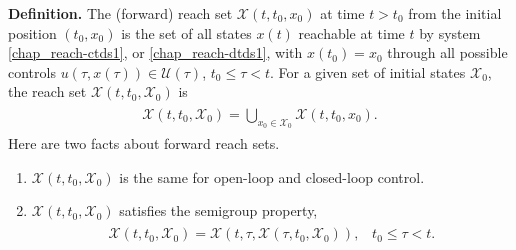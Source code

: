 \documentclass[letterpaper,10pt,english]{sphinxmanual}
\begin{document}
\textbf{Definition.} The (forward) reach set ${\mathcal X}(t, t_0, x_0)$ at time
$t>t_0$ from the initial position $(t_0, x_0)$ is the set of
all states $x(t)$ reachable at time $t$ by system \eqref{chap_reach-ctds1},
or \eqref{chap_reach-dtds1}, with $x(t_0)=x_0$ through all possible controls
$u(\tau, x(\tau))\in{\mathcal U}(\tau)$,
$t_0\leqslant\tau< t$. For a given set of initial states
${\mathcal X}_0$, the reach set
${\mathcal X}(t, t_0, {\mathcal X}_0)$ is
\label{chap_reach:equation-def_olrs}\begin{gather}
\begin{split}{\mathcal X}(t, t_0, {\mathcal X}_0) = \bigcup_{x_0\in{\mathcal X}_0}{\mathcal X}(t, t_0, x_0).\end{split}\label{chap_reach-def_olrs}
\end{gather}
Here are two facts about forward reach sets.
\begin{enumerate}
\item {} 
${\mathcal X}(t, t_0, {\mathcal X}_0)$ is the same for
open-loop and closed-loop control.

\item {} 
${\mathcal X}(t, t_0, {\mathcal X}_0)$ satisfies the semigroup
property,
\label{chap_reach:equation-semigroup}\begin{gather}
\begin{split}{\mathcal X}(t, t_0, {\mathcal X}_0) = {\mathcal X}(t, \tau, {\mathcal X}(\tau, t_0, {\mathcal X}_0)), \;\;\;
t_0\leqslant\tau< t.\end{split}\label{chap_reach-semigroup}
\end{gather}
\end{enumerate}
\end{document}
